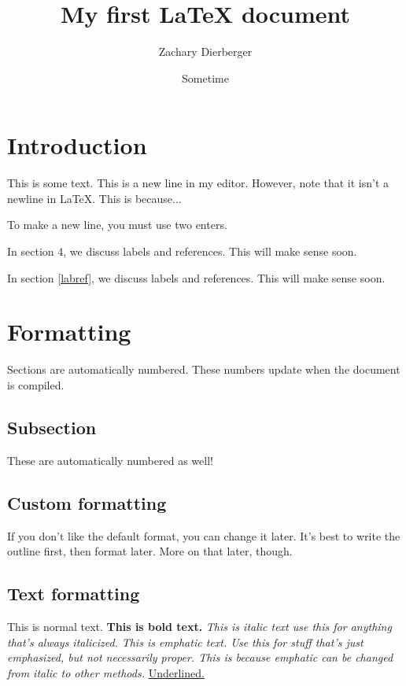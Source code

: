 \documentclass{article}
\author{Zachary Dierberger}
\title{My first {\LaTeX} document}
\date{Sometime}
\begin{document}
\maketitle

\section{Introduction}

This is some text. This is a new line in my editor. However, note that it isn't
a newline in LaTeX. This is because...

To make a new line, you must use two enters.

In section 4, we discuss labels and references. This will make sense soon.

In section \ref{labref}, we discuss labels and references. This will make sense
soon.



\section{Formatting}

Sections are automatically numbered. These numbers update when the document is compiled.

\subsection{Subsection}

These are automatically numbered as well!

\subsection{Custom formatting}

If you don't like the default format, you can change it later. It's best to
write the outline first, then format later. More on that later, though.

\subsection{Text formatting}

This is normal text. \textbf{This is bold text.} \textit{This is italic text
use this for anything that's always italicized.} \emph{This is emphatic text.
Use this for stuff that's just emphasized, but not necessarily proper. This is
because emphatic can be changed from italic to other methods.}
\underline{Underlined.}
\end{document}
